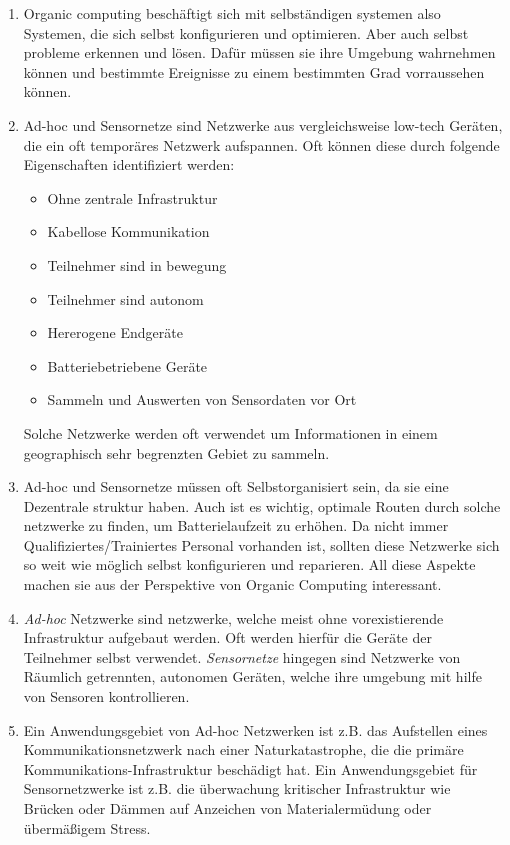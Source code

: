 
\date{Donnerstag 10.05.2020}


    \maketitle
    \thispagestyle{fancy}

    \begin{enumerate}[label=\arabic*)]
        \item Organic computing beschäftigt sich mit selbständigen systemen also Systemen, die sich selbst konfigurieren und optimieren. Aber auch selbst probleme erkennen und lösen. Dafür müssen sie ihre Umgebung wahrnehmen können und bestimmte Ereignisse zu einem bestimmten Grad vorraussehen können. 

        \item Ad-hoc und Sensornetze sind Netzwerke aus vergleichsweise low-tech Geräten, die ein oft temporäres Netzwerk aufspannen. Oft können diese durch folgende Eigenschaften identifiziert werden:
            \begin{itemize}
                \item Ohne zentrale Infrastruktur
                \item Kabellose Kommunikation
                \item Teilnehmer sind in bewegung
                \item Teilnehmer sind autonom
                \item Hererogene Endgeräte
                \item Batteriebetriebene Geräte
                \item Sammeln und Auswerten von Sensordaten vor Ort
            \end{itemize}
        Solche Netzwerke werden oft verwendet um Informationen in einem geographisch sehr begrenzten Gebiet zu sammeln. 
        \item Ad-hoc und Sensornetze müssen oft Selbstorganisiert sein, da sie eine Dezentrale struktur haben. Auch ist es wichtig, optimale Routen durch solche netzwerke zu finden, um Batterielaufzeit zu erhöhen. Da nicht immer Qualifiziertes/Trainiertes Personal vorhanden ist, sollten diese Netzwerke sich so weit wie möglich selbst konfigurieren und reparieren. All diese Aspekte machen sie aus der Perspektive von Organic Computing interessant.
        \item \emph{Ad-hoc} Netzwerke sind netzwerke, welche meist ohne vorexistierende Infrastruktur aufgebaut werden. Oft werden hierfür die Geräte der Teilnehmer selbst verwendet. \emph{Sensornetze} hingegen sind Netzwerke von Räumlich getrennten, autonomen Geräten, welche ihre umgebung mit hilfe von Sensoren kontrollieren. 
        \item Ein Anwendungsgebiet von Ad-hoc Netzwerken ist z.B. das Aufstellen eines Kommunikationsnetzwerk nach einer Naturkatastrophe, die die primäre Kommunikations-Infrastruktur beschädigt hat. Ein Anwendungsgebiet für Sensornetzwerke ist z.B. die überwachung kritischer Infrastruktur wie Brücken oder Dämmen auf Anzeichen von Materialermüdung oder übermäßigem Stress.
    \end{enumerate}

